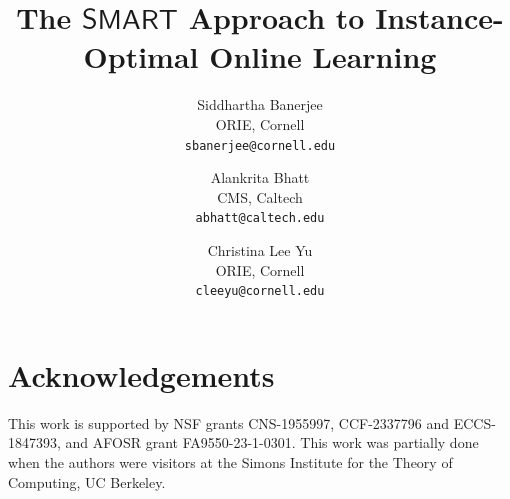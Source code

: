\documentclass[11pt,letterpaper]{article}
\author{%
Siddhartha Banerjee \\ORIE, Cornell\\\texttt{sbanerjee@cornell.edu} \\
 \and
 Alankrita Bhatt \\CMS, Caltech\\\texttt{abhatt@caltech.edu}\\
\and
 Christina Lee Yu\\ORIE, Cornell\\ \texttt{cleeyu@cornell.edu}
}
\title{\textbf{The $\mathsf{SMART}$ Approach to Instance-Optimal Online Learning}}
\date{\vspace{-1em}}
\begin{document}
\maketitle
\begin{abstract}%
 
\end{abstract}

%

% 
% 

%




\section*{Acknowledgements}

This work is supported by NSF grants CNS-1955997, CCF-2337796 and ECCS-1847393, and AFOSR grant FA9550-23-1-0301. This work was partially done when the authors were visitors at the Simons Institute for the Theory of Computing, UC Berkeley. 

\appendix


 

 
\end{document}
